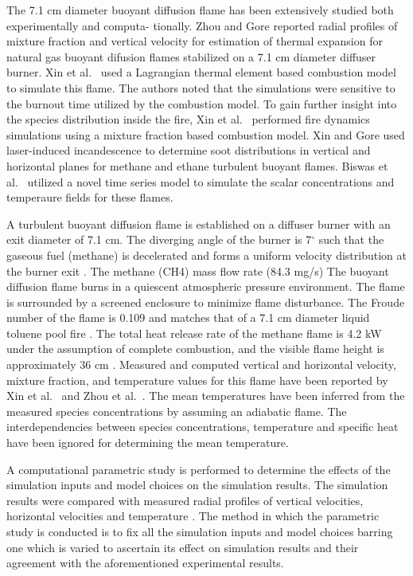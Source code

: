 The 7.1 cm diameter buoyant diffusion flame has been extensively studied both experimentally and computa- tionally. Zhou and Gore \cite{Zhou:CS1998} reported radial profiles of mixture fraction and vertical velocity for estimation of thermal expansion for natural gas buoyant difusion flames stabilized on a 7.1 cm diameter diffuser burner. Xin et al.~\cite{Xin:CSS2002} used a Lagrangian thermal element based combustion model to simulate this flame. The authors noted that the simulations were sensitive to the burnout time utilized by the combustion model. To gain further insight into the species distribution inside the fire, Xin et al.~\cite{Xin:CF2005} performed fire dynamics simulations using a mixture fraction based combustion model. Xin and Gore \cite{Xin:CS2005} used laser-induced incandescence to determine soot distributions in vertical and horizontal planes for methane and ethane turbulent buoyant flames. Biswas et al.~\cite{Biswas:CS2007} utilized a novel time series model to simulate the scalar concentrations and temperaure fields for these flames.

A turbulent buoyant diffusion flame is established on a diffuser burner with an exit diameter of 7.1 cm. The diverging angle of the burner is 7$^\circ$ such that the gaseous fuel (methane) is decelerated and forms a uniform velocity distribution at the burner exit \cite{Xin:CF2005}. The methane (CH4) mass flow rate (84.3 mg/s) The buoyant diffusion flame burns in a quiescent atmospheric pressure environment. The flame is surrounded by a screened enclosure to minimize flame disturbance. The Froude number of the flame is 0.109 and matches that of a 7.1 cm diameter liquid toluene pool fire \cite{Xin:CF2005,Zhou:CS1998}. The total heat release rate of the methane flame is 4.2 kW under the assumption of complete combustion, and the visible flame height is approximately 36 cm \cite{Xin:CF2005}. Measured and computed vertical and horizontal velocity, mixture fraction, and temperature values for this flame have been reported by Xin et al.~\cite{Xin:CF2005,Xin:PhD2002} and Zhou et al.~\cite{Zhou:CS1998,Zhou:PurduePhD1999}. The mean temperatures have been inferred from the measured species concentrations \cite{Xin:CF2005} by assuming an adiabatic flame. The interdependencies between species concentrations, temperature and specific heat have been ignored for determining the mean temperature.

A computational parametric study is performed to determine the effects of the simulation inputs and model choices on the simulation results. The simulation results were compared with measured radial profiles of vertical velocities, horizontal velocities and temperature \cite{Xin:CF2005}. The method in which the parametric study is conducted is to fix all the simulation inputs and model choices barring one which is varied to ascertain its effect on simulation results and their agreement with the aforementioned experimental results.


